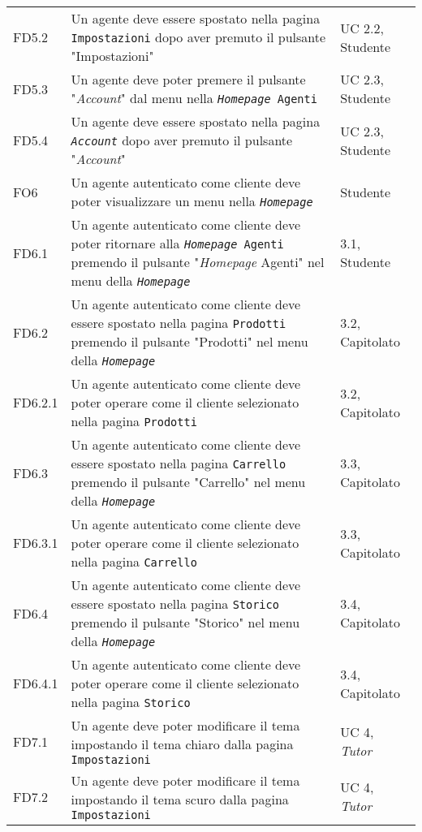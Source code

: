 \begin{center}
\begin{longtable}{|p{2.25cm}|p{7.75cm}|p{2.25cm}|}
    FD5.2 & Un agente deve essere spostato nella pagina \texttt{Impostazioni} dopo aver premuto il pulsante "Impostazioni" & UC 2.2, Studente \\
    FD5.3 & Un agente deve poter premere il pulsante "\textit{Account}" dal menu nella \texttt{\textit{Homepage} Agenti} & UC 2.3, Studente \\
    FD5.4 & Un agente deve essere spostato nella pagina \textit{\texttt{Account}} dopo aver premuto il pulsante "\textit{Account}" & UC 2.3, Studente \\
    FO6 & Un agente autenticato come cliente deve poter visualizzare un menu nella \textit{\texttt{Homepage}} & Studente \\
    FD6.1 & Un agente autenticato come cliente deve poter ritornare alla \texttt{\textit{Homepage} Agenti} premendo 
            il pulsante "\textit{Homepage} Agenti" nel menu della \textit{\texttt{Homepage}} & 3.1, Studente \\
    FD6.2 & Un agente autenticato come cliente deve essere spostato nella pagina \texttt{Prodotti} premendo 
            il pulsante "Prodotti" nel menu della \textit{\texttt{Homepage}} & 3.2, Capitolato \\
    FD6.2.1 & Un agente autenticato come cliente deve poter operare come il cliente selezionato nella pagina \texttt{Prodotti} & 3.2, Capitolato \\
    FD6.3 & Un agente autenticato come cliente deve essere spostato nella pagina \texttt{Carrello} premendo 
            il pulsante "Carrello" nel menu della \textit{\texttt{Homepage}} & 3.3, Capitolato \\
    FD6.3.1 & Un agente autenticato come cliente deve poter operare come il cliente selezionato nella pagina \texttt{Carrello} & 3.3, Capitolato \\
    FD6.4 & Un agente autenticato come cliente deve essere spostato nella pagina \texttt{Storico} premendo 
            il pulsante "Storico" nel menu della \textit{\texttt{Homepage}} & 3.4, Capitolato \\
    FD6.4.1 & Un agente autenticato come cliente deve poter operare come il cliente selezionato nella pagina \texttt{Storico} & 3.4, Capitolato \\
    FD7.1 & Un agente deve poter modificare il tema impostando il tema chiaro dalla pagina \texttt{Impostazioni} & UC 4, \textit{Tutor} \\
    FD7.2 & Un agente deve poter modificare il tema impostando il tema scuro dalla pagina \texttt{Impostazioni} & UC 4, \textit{Tutor} \\

\end{longtable}
\end{center}
